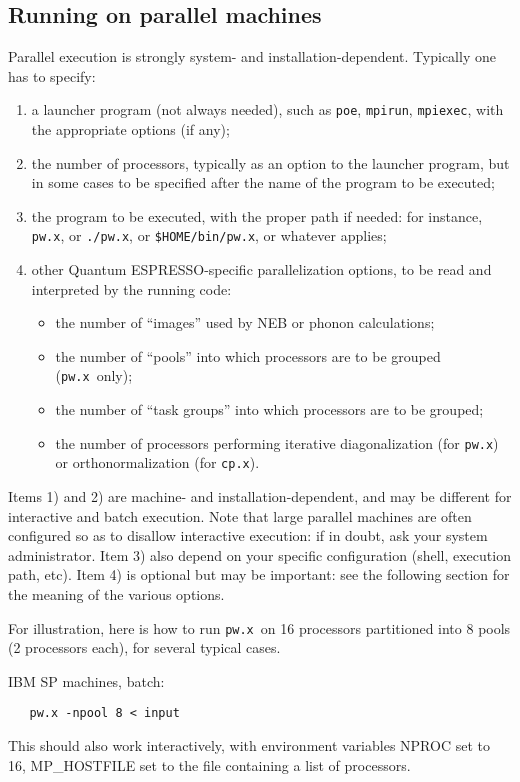 \documentclass[12pt,a4paper]{article}
\def\qe{{\sc Quantum ESPRESSO}}
\def\pwx{\texttt{pw.x}}
\def\cpx{\texttt{cp.x}}
\begin{document}
\subsection{Running on parallel machines}
\label{SubSec:para}

Parallel execution is strongly system- and installation-dependent. 
Typically one has to specify:
\begin{enumerate}
\item a launcher program (not always needed), 
such as \texttt{poe}, \texttt{mpirun}, \texttt{mpiexec},
  with the  appropriate options (if any);
\item the number of processors, typically as an option to the launcher
  program, but in some cases to be specified after the name of the
  program to be
  executed; 
\item the program to be executed, with the proper path if needed: for
  instance, \pwx, or \texttt{./pw.x}, or \texttt{\$HOME/bin/pw.x}, or
  whatever applies; 
\item other \qe-specific parallelization options, to be
  read and interpreted by the running code: 
\begin{itemize}
\item the number of ``images'' used by NEB or phonon calculations;
\item the number of ``pools'' into which processors are to be grouped
  (\pwx\ only);
\item the number of ``task groups'' into which processors are to be
  grouped;
\item the number of processors performing iterative diagonalization
  (for \pwx) or orthonormalization (for \cpx).
\end{itemize}
\end{enumerate}
Items 1) and 2) are machine- and installation-dependent, and may be 
different for interactive and batch execution. Note that large
parallel machines are  often configured so as to disallow interactive
execution: if in doubt, ask your system administrator.
Item 3) also depend on your specific configuration (shell, execution
path, etc). 
Item 4) is optional but may be important: see the following section
for the meaning of the various options.

For illustration, here is how to run \pwx\ on 16 processors partitioned into
8 pools (2 processors each), for several typical cases. 

IBM SP machines, batch:
\begin{verbatim}
   pw.x -npool 8 < input
\end{verbatim}
This should also work interactively, with environment variables NPROC
set to 16, MP\_HOSTFILE set to the file containing a list of processors.
\end{document}
